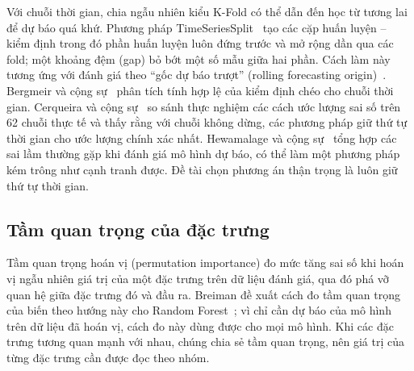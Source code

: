 Với chuỗi thời gian, chia ngẫu nhiên kiểu K-Fold có thể dẫn đến học từ tương lai để dự báo quá khứ. Phương pháp TimeSeriesSplit~\cite{sklearn2026tss} tạo các cặp huấn luyện -- kiểm định trong đó phần huấn luyện luôn đứng trước và mở rộng dần qua các fold; một khoảng đệm (gap) bỏ bớt một số mẫu giữa hai phần. Cách làm này tương ứng với đánh giá theo ``gốc dự báo trượt'' (rolling forecasting origin)~\cite[mục 5.10]{hyndman2021fpp3}. Bergmeir và cộng sự~\cite{bergmeir2012use,bergmeir2018note} phân tích tính hợp lệ của kiểm định chéo cho chuỗi thời gian. Cerqueira và cộng sự~\cite{cerqueira2020evaluating} so sánh thực nghiệm các cách ước lượng sai số trên 62 chuỗi thực tế và thấy rằng với chuỗi không dừng, các phương pháp giữ thứ tự thời gian cho ước lượng chính xác nhất. Hewamalage và cộng sự~\cite{hewamalage2023forecast} tổng hợp các sai lầm thường gặp khi đánh giá mô hình dự báo, có thể làm một phương pháp kém trông như cạnh tranh được. Đề tài chọn phương án thận trọng là luôn giữ thứ tự thời gian.

\subsection{Tầm quan trọng của đặc trưng}
Tầm quan trọng hoán vị (permutation importance) đo mức tăng sai số khi hoán vị ngẫu nhiên giá trị của một đặc trưng trên dữ liệu đánh giá, qua đó phá vỡ quan hệ giữa đặc trưng đó và đầu ra. Breiman đề xuất cách đo tầm quan trọng của biến theo hướng này cho Random Forest~\cite{breiman2001random}; vì chỉ cần dự báo của mô hình trên dữ liệu đã hoán vị, cách đo này dùng được cho mọi mô hình. Khi các đặc trưng tương quan mạnh với nhau, chúng chia sẻ tầm quan trọng, nên giá trị của từng đặc trưng cần được đọc theo nhóm.
